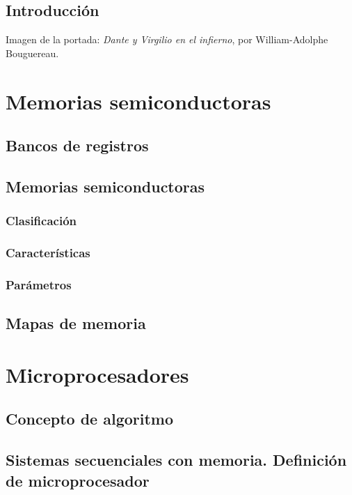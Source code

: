 \documentclass[a4paper]{book}
\numberwithin{figure}{chapter}
\numberwithin{equation}{chapter}
\begin{document}
\begin{figure}[t!]
\begin{subfigure}[b]{0.25\linewidth}
	\end{subfigure}
\end{figure}


\newpage


\section*{Introducción}
Imagen de la portada: \textsl{Dante y Virgilio en el infierno}, por William-Adolphe Bouguereau.


\newpage

\setlength{\parskip}{0em}
\tableofcontents 
\setlength{\parskip}{0.5em}

\chapter{Memorias semiconductoras}
\section{Bancos de registros}
\section{Memorias semiconductoras}
\subsection{Clasificación}
\subsection{Características}
\subsection{Parámetros}

\section{Mapas de memoria}

\chapter{Microprocesadores}
\section{Concepto de algoritmo}
\section{Sistemas secuenciales con memoria. Definición de microprocesador}
\end{document}
